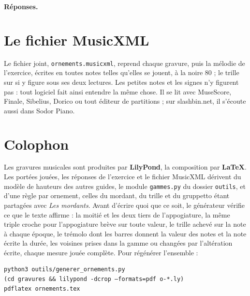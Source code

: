 \documentclass[a4paper,11pt]{article}
\begin{document}
\begin{remarque}
\textbf{Réponses.}

\end{remarque}

\section{Le fichier MusicXML}
\label{sec:musicxml}

Le fichier joint, \texttt{ornements.musicxml}, reprend chaque gravure, puis la
mélodie de l'exercice, écrites en toutes notes telles qu'elles se jouent, à la
noire 80 ; le trille sur si y figure sous ses deux lectures. Les petites notes
et les signes n'y figurent pas : tout logiciel fait ainsi entendre la même
chose. Il se lit avec MuseScore, Finale, Sibelius, Dorico ou tout éditeur de
partitions ; sur slashbin.net, il s'écoute aussi dans Sodor Piano.

\section*{Colophon}

Les gravures musicales sont produites par \textbf{LilyPond}, la composition
par \textbf{\LaTeX}. Les portées jouées, les réponses de l'exercice et le
fichier MusicXML dérivent du modèle de hauteurs des autres guides, le module
\texttt{gammes.py} du dossier \texttt{outils}, et d'une règle par ornement,
celles du mordant, du trille et du gruppetto étant partagées avec \emph{Les
mordants}. Avant d'écrire quoi que ce soit, le générateur vérifie ce que le
texte affirme : la moitié et les deux tiers de l'appogiature, la même triple
croche pour l'appogiature brève sur toute valeur, le trille achevé sur la note
à chaque époque, le trémolo dont les barres donnent la valeur des notes et la
note écrite la durée, les voisines prises dans la gamme ou changées par
l'altération écrite, chaque mesure jouée complète. Pour régénérer l'ensemble :

\begin{center}
\texttt{python3 outils/generer\_ornements.py}\\
\texttt{(cd gravures \&\& lilypond -dcrop --formats=pdf o-*.ly)}\\
\texttt{pdflatex ornements.tex}
\end{center}
\end{document}
